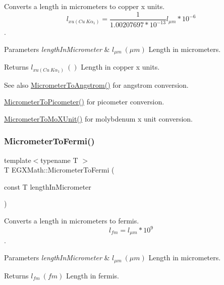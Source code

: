 Converts a length in micrometers to copper x units. \[ l_{xu(Cu\ K\alpha_1)}= \frac{1}{1.00207697*10^{-13}} l_{\mu m} * 10^{-6}\]. 


\begin{DoxyParams}{Parameters}
{\em length\+In\+Micrometer} & $ l_{\mu m}\ (\mu m)$ Length in micrometers. \\
\hline
\end{DoxyParams}
\begin{DoxyReturn}{Returns}
$ l_{xu(Cu\ K\alpha_1)}\ ()$ Length in copper x units. 
\end{DoxyReturn}
\begin{DoxySeeAlso}{See also}
\mbox{\hyperlink{group___e_g_x_math-_conversions-_length_conversions-_micrometer-_non-_s_i_ga4b7df35169682046455e9a6f99447777}{Micrometer\+To\+Angstrom()}} for angstrom conversion. 

\mbox{\hyperlink{group___e_g_x_math-_conversions-_length_conversions-_micrometer-_s_i_ga912ed4989391eeb5d25f43e99108502e}{Micrometer\+To\+Picometer()}} for picometer conversion. 

\mbox{\hyperlink{group___e_g_x_math-_conversions-_length_conversions-_micrometer-_non-_s_i_ga2ed475ce56e23d7783d6925f5b409f44}{Micrometer\+To\+Mo\+X\+Unit()}} for molybdenum x unit conversion. 
\end{DoxySeeAlso}
\mbox{\label{group___e_g_x_math-_conversions-_length_conversions-_micrometer-_non-_s_i_ga23f5f429bc4df952e3d874fb944bd1ce}} 
\subsubsection{\texorpdfstring{Micrometer\+To\+Fermi()}{MicrometerToFermi()}}
{\footnotesize\ttfamily template$<$typename T $>$ \\
T E\+G\+X\+Math\+::\+Micrometer\+To\+Fermi (\begin{DoxyParamCaption}\item[{const T}]{length\+In\+Micrometer }\end{DoxyParamCaption})}



Converts a length in micrometers to fermis. \[ l_{fm}=l_{\mu m} * 10^{9} \]. 


\begin{DoxyParams}{Parameters}
{\em length\+In\+Micrometer} & $ l_{\mu m}\ (\mu m)$ Length in micrometers. \\
\hline
\end{DoxyParams}
\begin{DoxyReturn}{Returns}
$ l_{fm}\ (fm)$ Length in fermis. 
\end{DoxyReturn}
\mbox{\label{group___e_g_x_math-_conversions-_length_conversions-_micrometer-_non-_s_i_ga5dc2a5dba0313f6a71db082aff501329}} 
